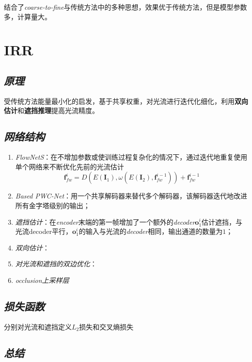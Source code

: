 结合了\textsl{coarse-to-fine}与传统方法中的多种思想，效果优于传统方法，但是模型参数多，计算量大。

\section{IRR}

\subsection*{\textsl{原理}}

受传统方法能量最小化的启发，基于共享权重，对光流进行迭代化细化，利用\textbf{双向估计}和\textbf{遮挡推理}提高光流精度。

\subsection*{\textsl{网络结构}}

\begin{enumerate}[itemindent=2em]
    \item \textsl{FlowNetS}：在不增加参数或使训练过程复杂化的情况下，通过迭代地重复使用单个网络来不断优化先前的光流估计
    \begin{equation}
        \mathbf{f}^i_{fw}=D(E(\mathbf{I}_1),\omega(E(\mathbf{I}_2),\mathbf{f}^{i-1}_{fw}))+\mathbf{f}^{i-1}_{fw}
    \end{equation}

    \item \textsl{Based PWC-Net}：用一个共享解码器来替代多个解码器，该解码器迭代地改进所有金字塔级别的输出；
    \item \textsl{遮挡估计}：在\textsl{encoder}末端的第一帧增加了一个额外的\textsl{decoder}$\mathbf{o}^{i}_1$估计遮挡，与光流decoder平行，$\mathbf{o}^{i}_1$的输入与光流的\textsl{decoder}相同，输出通道的数量为$1$；
    \item \textsl{双向估计}：
    \item \textsl{对光流和遮挡的双边优化}：
    \item \textsl{occlusion上采样层}
\end{enumerate}

\subsection*{\textsl{损失函数}}

分别对光流和遮挡定义$L_2$损失和交叉熵损失

\subsection*{\textsl{总结}}

